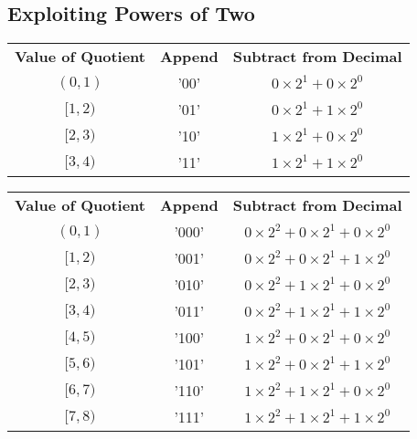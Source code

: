\documentclass[12pt]{article}
\begin{document}
\subsection{Exploiting Powers of Two}

\begin{center}
\begin{tabular}{c|c|c}
    \textbf{Value of Quotient} & \textbf{Append} & \textbf{Subtract from Decimal} \\
    $(0,1)$   & '00' & $0\times2^1 + 0\times2^0$ \\
    $[1,2)$   & '01' & $0\times2^1 + 1\times2^0$ \\
    $[2,3)$   & '10' & $1\times2^1 + 0\times2^0$ \\
    $[3,4)$   & '11' & $1\times2^1 + 1\times2^0$
\end{tabular}
\end{center}

\begin{center}
\begin{tabular}{c|c|c}
    \textbf{Value of Quotient} & \textbf{Append} & \textbf{Subtract from Decimal} \\
    $(0,1)$   & '000' & $0\times2^2 + 0\times2^1 + 0\times2^0$ \\
    $[1,2)$   & '001' & $0\times2^2 + 0\times2^1 + 1\times2^0$ \\
    $[2,3)$   & '010' & $0\times2^2 + 1\times2^1 + 0\times2^0$ \\
    $[3,4)$   & '011' & $0\times2^2 + 1\times2^1 + 1\times2^0$ \\
    $[4,5)$   & '100' & $1\times2^2 + 0\times2^1 + 0\times2^0$ \\
    $[5,6)$   & '101' & $1\times2^2 + 0\times2^1 + 1\times2^0$ \\
    $[6,7)$   & '110' & $1\times2^2 + 1\times2^1 + 0\times2^0$ \\
    $[7,8)$   & '111' & $1\times2^2 + 1\times2^1 + 1\times2^0$
\end{tabular}
\end{center}
\end{document}
